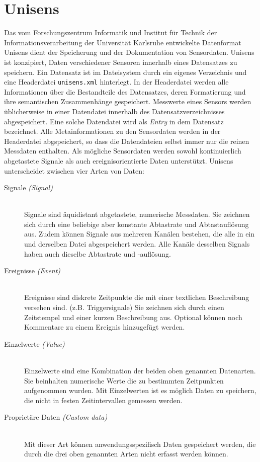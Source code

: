 \section{Unisens}

Das vom Forschungszentrum Informatik und Institut f\"ur Technik der Informationsverarbeitung der Universit\"at Karlsruhe entwickelte Datenformat Unisens dient der Speicherung und der Dokumentation von Sensordaten.
Unisens ist konzipiert, Daten verschiedener Sensoren innerhalb eines Datensatzes zu speichern.
Ein Datensatz ist im Dateisystem durch ein eigenes Verzeichnis und eine Headerdatei \verb|unisens.xml| hinterlegt.
In der Headerdatei werden alle Informationen \"uber die Bestandteile des Datensatzes, deren Formatierung und ihre semantischen Zusammenh\"ange gespeichert.
Messwerte eines Sensors werden \"ublicherweise in einer Datendatei innerhalb des Datensatzverzeichnisses abgespeichert.
Eine solche Datendatei wird als \emph{Entry} in dem Datensatz bezeichnet.
Alle Metainformationen zu den Sensordaten werden in der Headerdatei abgspeichert, so dass die Datendateien selbst immer nur die reinen Messdaten enthalten.
Als m\"ogliche Sensordaten werden sowohl kontinuierlich abgetastete Signale als auch ereignisorientierte Daten unterst\"utzt.
Unisens unterscheidet zwischen vier Arten von Daten:
\begin{description}
	\item[Signale \emph{(Signal)}] \hfill \\
		Signale sind \"aquidistant abgetastete, numerische Messdaten.
		Sie zeichnen sich durch eine beliebige aber konstante Abtastrate und Abtastaufl\"osung aus.
		Zudem k\"onnen Signale aus mehreren Kan\"alen bestehen, die alle in ein und derselben Datei abgespeichert werden.
		Alle Kan\"ale desselben Signals haben auch dieselbe Abtastrate und -aufl\"osung.
	\item[Ereignisse \emph{(Event)}] \hfill \\
		Ereignisse sind diskrete Zeitpunkte die mit einer textlichen Beschreibung versehen sind. (z.B. Triggersignale)
		Sie zeichnen sich durch einen Zeitstempel und einer kurzen Beschreibung aus.
		Optional k\"onnen noch Kommentare zu einem Ereignis hinzugef\"ugt werden.
	\item[Einzelwerte \emph{(Value)}] \hfill \\
		Einzelwerte sind eine Kombination der beiden oben genannten Datenarten.
		Sie beinhalten numerische Werte die zu bestimmten Zeitpunkten aufgenommen wurden.
		Mit Einzelwerten ist es m\"oglich Daten zu speichern, die nicht in festen Zeitintervallen gemessen werden.
	\item[Propriet\"are Daten \emph{(Custom data)}] \hfill \\
		Mit dieser Art k\"onnen anwendungsspezifisch Daten gespeichert werden, die durch die drei oben genannten Arten nicht erfasst werden k\"onnen.
\end{description}

